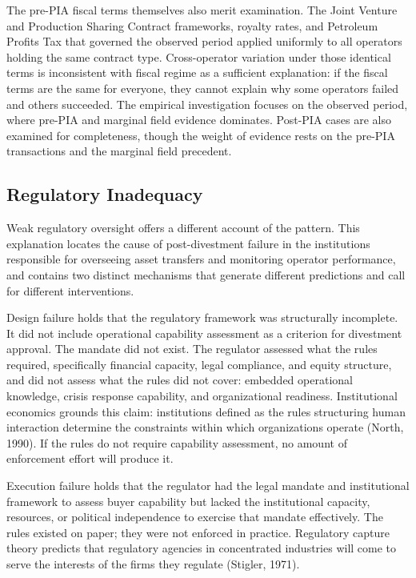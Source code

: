 The pre-PIA fiscal terms themselves also merit examination. The Joint
Venture and Production Sharing Contract frameworks, royalty rates, and
Petroleum Profits Tax that governed the observed period applied
uniformly to all operators holding the same contract type.
Cross-operator variation under those identical terms is inconsistent
with fiscal regime as a sufficient explanation: if the fiscal terms are
the same for everyone, they cannot explain why some operators failed and
others succeeded. The empirical investigation focuses on the observed
period, where pre-PIA and marginal field evidence dominates. Post-PIA
cases are also examined for completeness, though the weight of evidence
rests on the pre-PIA transactions and the marginal field precedent.

\hypertarget{regulatory-inadequacy}{%
\subsection{Regulatory Inadequacy}\label{regulatory-inadequacy}}

Weak regulatory oversight offers a different account of the pattern.
This explanation locates the cause of post-divestment failure in the
institutions responsible for overseeing asset transfers and monitoring
operator performance, and contains two distinct mechanisms that generate
different predictions and call for different interventions.

Design failure holds that the regulatory framework was structurally
incomplete. It did not include operational capability assessment as a
criterion for divestment approval. The mandate did not exist. The
regulator assessed what the rules required, specifically financial
capacity, legal compliance, and equity structure, and did not assess
what the rules did not cover: embedded operational knowledge, crisis
response capability, and organizational readiness. Institutional
economics grounds this claim: institutions defined as the rules
structuring human interaction determine the constraints within which
organizations operate (North, 1990). If the rules do not require
capability assessment, no amount of enforcement effort will produce it.

Execution failure holds that the regulator had the legal mandate and
institutional framework to assess buyer capability but lacked the
institutional capacity, resources, or political independence to exercise
that mandate effectively. The rules existed on paper; they were not
enforced in practice. Regulatory capture theory predicts that regulatory
agencies in concentrated industries will come to serve the interests of
the firms they regulate (Stigler, 1971).

